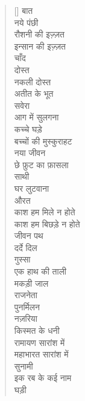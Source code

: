 \begin{verse}[\versewidth]\texthindi{
बात\\
नये पंछी\\
रौशनी की इज़्ज़त\\
इन्सान की इज़्ज़त\\
चाँद\\
दोस्त\\
नकली दोस्त\\
अतीत के भूत\\
सवेरा\\
आग में सुलगना\\
कच्चे घड़े\\
बच्चों की मुस्कुराहट\\
नया जीवन\\
छे फ़ुट का फ़ासला\\
साथी\\
घर लुटवाना\\
औरत\\
काश हम मिले न होते\\
काश हम बिछड़े न होते\\
जीवन पथ\\
दर्दे दिल\\
गुस्सा\\
एक हाथ की ताली\\
मकड़ी जाल\\
राजनेता\\
पुनर्मिलन\\
नज़रिया\\
किस्मत के धनी\\
रामायण सारांश में\\
महाभारत सारांश में\\
सुनामी\\
इक रब के कई नाम\\
घड़ी
}
\end{verse}

